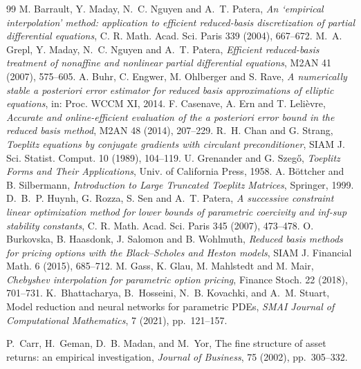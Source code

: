 \begin{thebibliography}{99}
M. Barrault, Y. Maday, N.~C. Nguyen and A.~T. Patera, \emph{An `empirical interpolation' method:
application to efficient reduced-basis discretization of partial differential equations},
C. R. Math. Acad. Sci. Paris 339 (2004), 667--672.
M.~A. Grepl, Y. Maday, N.~C. Nguyen and A.~T. Patera, \emph{Efficient reduced-basis treatment of
nonaffine and nonlinear partial differential equations}, M2AN 41 (2007), 575--605.
A. Buhr, C. Engwer, M. Ohlberger and S. Rave, \emph{A numerically stable a posteriori error
estimator for reduced basis approximations of elliptic equations}, in: Proc. WCCM XI, 2014.
F. Casenave, A. Ern and T. Leli\`evre, \emph{Accurate and online-efficient evaluation of the a
posteriori error bound in the reduced basis method}, M2AN 48 (2014), 207--229.
R.~H. Chan and G. Strang, \emph{Toeplitz equations by conjugate gradients with circulant
preconditioner}, SIAM J. Sci. Statist. Comput. 10 (1989), 104--119.
U. Grenander and G. Szeg\H{o}, \emph{Toeplitz Forms and Their Applications}, Univ. of California Press, 1958.
A. B\"ottcher and B. Silbermann, \emph{Introduction to Large Truncated Toeplitz Matrices}, Springer, 1999.
D.~B.~P. Huynh, G. Rozza, S. Sen and A.~T. Patera, \emph{A successive constraint linear optimization
method for lower bounds of parametric coercivity and inf-sup stability constants},
C. R. Math. Acad. Sci. Paris 345 (2007), 473--478.
O. Burkovska, B. Haasdonk, J. Salomon and B. Wohlmuth, \emph{Reduced basis methods for pricing
options with the Black--Scholes and Heston models}, SIAM J. Financial Math. 6 (2015), 685--712.
M. Gass, K. Glau, M. Mahlstedt and M. Mair, \emph{Chebyshev interpolation for parametric option
pricing}, Finance Stoch. 22 (2018), 701--731.
K.~Bhattacharya, B.~Hosseini, N.~B. Kovachki, and A.~M. Stuart,
\newblock Model reduction and neural networks for parametric PDEs,
\newblock \emph{SMAI Journal of Computational Mathematics}, 7 (2021),
pp.~121--157.

P.~Carr, H.~Geman, D.~B. Madan, and M.~Yor,
\newblock The fine structure of asset returns: an empirical investigation,
\newblock \emph{Journal of Business}, 75 (2002), pp.~305--332.


\end{thebibliography}
